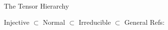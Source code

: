 \documentclass[aspectratio=169,10pt]{beamer}
\begin{document}
\begin{frame}{The Tensor Hierarchy}
\begin{center}
    \end{center}

    \vspace{0.3em}
    {\footnotesize
    \textcolor{amber}{Injective} $\subset$
    \textcolor{leangreen}{Normal} $\subset$
    \textcolor{leanblue}{Irreducible} $\subset$
    \textcolor{softred}{General}
    \hfill
    Refs:~\cite{Perez-Garcia2007Matrix,Cirac2021Matrix}}
\end{frame}

\end{document}
